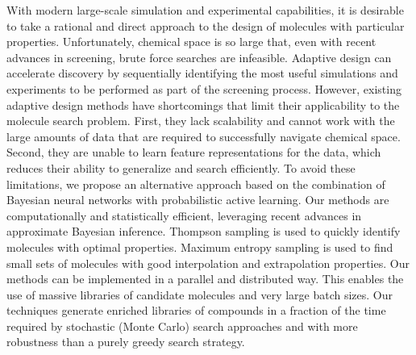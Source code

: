 
With modern large-scale simulation and experimental capabilities, it is desirable to take a rational and direct approach to the design of molecules with particular properties.  Unfortunately, chemical space is so large that, even with recent advances in screening, brute force searches are infeasible. Adaptive design can accelerate discovery by sequentially identifying the most useful simulations and experiments to be performed as part of the screening process. However, existing adaptive design methods have shortcomings that limit their applicability to the molecule search problem. First, they lack scalability and cannot work with the large amounts of data that are required to successfully navigate chemical space. Second, they are unable to learn feature representations for the data, which reduces their ability to generalize and search efficiently.  To avoid these limitations, we propose an alternative approach based on the combination of Bayesian neural networks with probabilistic active learning. Our
methods are computationally and statistically efficient, leveraging recent advances in approximate Bayesian inference. Thompson sampling is used to quickly identify molecules with optimal properties. Maximum entropy sampling is used to find small sets of molecules with good interpolation and extrapolation properties. Our methods can be implemented in a parallel and distributed way. This enables the use of massive libraries of candidate molecules and very large batch sizes. Our techniques generate enriched libraries of compounds in a fraction of the time required by stochastic (Monte Carlo) search approaches and with more robustness than a purely greedy search strategy.